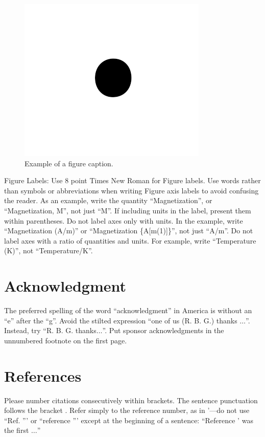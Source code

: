 \documentclass[conference]{IEEEtran}
\begin{document}
\begin{figure}[htbp]
\centerline{\includegraphics{fig1.png}}
\caption{Example of a figure caption.}
\label{fig}
\end{figure}

Figure Labels: Use 8 point Times New Roman for Figure labels. Use words 
rather than symbols or abbreviations when writing Figure axis labels to 
avoid confusing the reader. As an example, write the quantity 
``Magnetization'', or ``Magnetization, M'', not just ``M''. If including 
units in the label, present them within parentheses. Do not label axes only 
with units. In the example, write ``Magnetization (A/m)'' or ``Magnetization 
\{A[m(1)]\}'', not just ``A/m''. Do not label axes with a ratio of 
quantities and units. For example, write ``Temperature (K)'', not 
``Temperature/K''.

\section*{Acknowledgment}

The preferred spelling of the word ``acknowledgment'' in America is without 
an ``e'' after the ``g''. Avoid the stilted expression ``one of us (R. B. 
G.) thanks $\ldots$''. Instead, try ``R. B. G. thanks$\ldots$''. Put sponsor 
acknowledgments in the unnumbered footnote on the first page.

\section{References}

Please number citations consecutively within brackets. The 
sentence punctuation follows the bracket . Refer simply to the reference 
number, as in  '---do not use ``Ref.  ''' or ``reference  ''' except at 
the beginning of a sentence: ``Reference  ' was the first $\ldots$''
\end{document}
